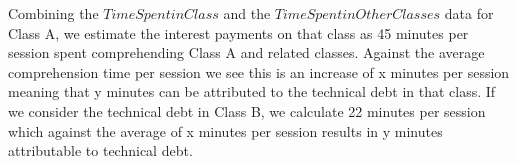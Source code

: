 
Combining the $Time Spent in Class$ and the $Time Spent in Other Classes$ data for Class A, we estimate the interest payments on that class as 45 minutes per session spent comprehending Class A and related classes.  Against the average comprehension time per session we see this is an increase of x minutes per session meaning that y minutes can be attributed to the technical debt in that class.  If we consider the technical debt in Class B, we calculate 22 minutes per session which against the average of x minutes per session results in y minutes attributable to technical debt.

